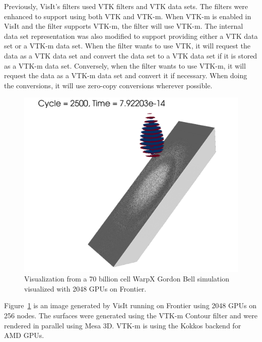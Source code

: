 Previously, VisIt’s filters used VTK filters and VTK data sets. The filters were enhanced to support using both VTK and VTK-m. When VTK-m is enabled in VisIt and the filter supports VTK-m, the filter will use VTK-m. The internal data set representation was also modified to support providing either a VTK data set or a VTK-m data set. When the filter wants to use VTK, it will request the data as a VTK data set and convert the data set to a VTK data set if it is stored as a VTK-m data set. Conversely, when the filter wants to use VTK-m, it will request the data as a VTK-m data set and convert it if necessary. When doing the conversions, it will use zero-copy conversions wherever possible.

\begin{figure}[htb]
  \includegraphics[width=\linewidth]{figures/visit_warpx_frontier.png}
  \caption{Visualization from a 70 billion cell WarpX Gordon Bell simulation visualized with 2048 GPUs on Frontier.}
  \label{fig:visit_warpx_frontier}
\end{figure}

Figure~\ref{fig:visit_warpx_frontier} is an image generated by VisIt running on Frontier using 2048 GPUs on 256 nodes. The surfaces were generated using the VTK-m Contour filter and were rendered in parallel using Mesa 3D. VTK-m is using the Kokkos backend for AMD GPUs.

